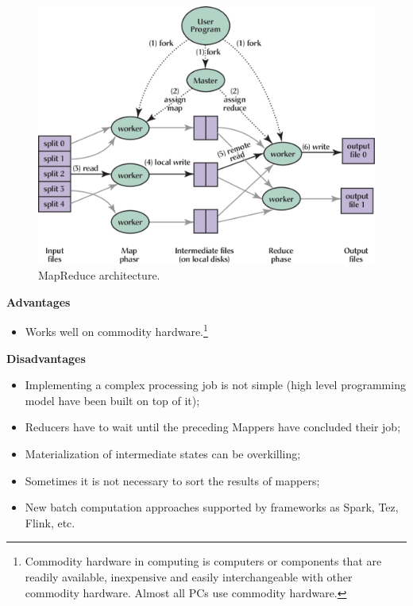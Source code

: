 \newpage

\begin{figure}[!htp]
    \centering
    \includegraphics[width=\textwidth]{img/mapreduce-2.png}
    \caption{MapReduce architecture.}
\end{figure}

\begin{flushleft}
    \textcolor{Green3}{\textbf{ Advantages}}
\end{flushleft}
\begin{itemize}
    \item Works well on commodity hardware.\footnote{Commodity hardware in computing is computers or components that are readily available, inexpensive and easily interchangeable with other commodity hardware. Almost all PCs use commodity hardware.}
\end{itemize}

\begin{flushleft}
    \textcolor{Red2}{\textbf{ Disadvantages}}
\end{flushleft}
\begin{itemize}
    \item Implementing a complex processing job is not simple (high level programming model have been built on top of it);

    \item Reducers have to wait until the preceding Mappers have concluded their job;

    \item Materialization of intermediate states can be overkilling;

    \item Sometimes it is not necessary to sort the results of mappers;

    \item New batch computation approaches supported by frameworks as Spark, Tez, Flink, etc.
\end{itemize}